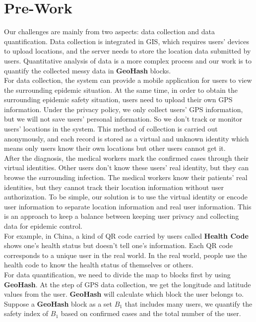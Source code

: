 \documentclass[sigplan,screen]{acmart}
\begin{document}
\section{Pre-Work}
Our challenges are mainly from two aspects: data collection and data quantification.
Data collection is integrated in GIS, which requires users' devices to upload locations, and the server needs to store the location data submitted by users.
Quantitative analysis of data is a more complex process and our work is to quantify the collected messy data in \textbf{GeoHash} blocks.
\\
For data collection, the system can provide a mobile application for users to view the surrounding epidemic situation.
At the same time, in order to obtain the surrounding epidemic safety situation, users need to upload their own GPS information.
Under the privacy policy, we only collect users' GPS information, but we will not save users' personal information. So we don't track or monitor users' locations in the system.
This method of collection is carried out anonymously, and each record is stored as a virtual and unknown identity which means only users know their own locations but other users cannot get it.
\\
After the diagnosis, the medical workers mark the confirmed cases through their virtual identities.
Other users don't know these users' real identity, but they can browse the surrounding infection.
The medical workers know their patients' real identities, but they cannot track their location information without user authorization.
To be simple, our solution is to use the virtual identity or encode user information to separate location information and real user information.
This is an approach to keep a balance between keeping user privacy and collecting data for epidemic control.
\\
For example, in China, a kind of QR code carried by users called \textbf{Health Code} shows one's health status but doesn't tell one's information.
Each QR code corresponds to a unique user in the real world.
In the real world, people use the health code to know the health status of themselves or others.
\\
For data quantification, we need to divide the map to blocks first by using \textbf{GeoHash}.
At the step of GPS data collection, we get the longitude and latitude values from the user.
\textbf{GeoHash} will calculate which block the user belongs to.
Suppose a \textbf{GeoHash} block as a set $B_1$ that includes many users, we quantify the safety index of $B_1$ based on confirmed cases and the total number of the user.
\end{document}
